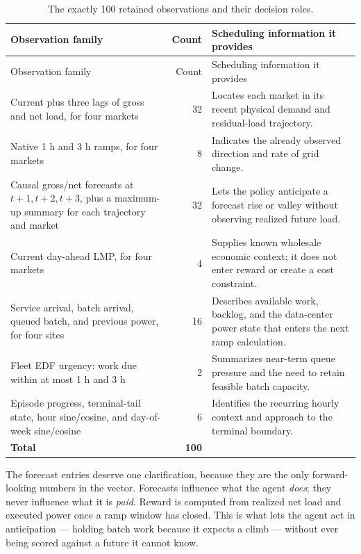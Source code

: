 ﻿\documentclass[12pt]{article}
\begin{document}
\begin{longtable}{@{}L{0.29\textwidth}rL{0.53\textwidth}@{}}
  \caption{The exactly 100 retained observations and their decision roles.}
  \label{tab:objective-observations}\\
  \toprule
  Observation family & Count & Scheduling information it provides \\
  \midrule
  \endfirsthead
  \toprule
  Observation family & Count & Scheduling information it provides \\
  \midrule
  \endhead
  Current plus three lags of gross and net load, for four markets
    & 32 & Locates each market in its recent physical demand and residual-load
      trajectory. \\
  Native 1 h and 3 h ramps, for four markets
    & 8 & Indicates the already observed direction and rate of grid change. \\
  Causal gross/net forecasts at \(t+1,t+2,t+3\), plus a maximum-up summary
  for each trajectory and market
    & 32 & Lets the policy anticipate a forecast rise or valley without observing
      realized future load. \\
  Current day-ahead LMP, for four markets
    & 4 & Supplies known wholesale economic context; it does not enter reward or
      create a cost constraint. \\
  Service arrival, batch arrival, queued batch, and previous power, for four
  sites
    & 16 & Describes available work, backlog, and the data-center power state that
      enters the next ramp calculation. \\
  Fleet EDF urgency: work due within at most 1 h and 3 h
    & 2 & Summarizes near-term queue pressure and the need to retain feasible
      batch capacity. \\
  Episode progress, terminal-tail state, hour sine/cosine, and day-of-week
  sine/cosine
    & 6 & Identifies the recurring hourly context and approach to the terminal
      boundary. \\
  \midrule
  \textbf{Total} & \textbf{100} & \\
  \bottomrule
\end{longtable}

The forecast entries deserve one clarification, because they are the only
forward-looking numbers in the vector. Forecasts influence what the agent
\emph{does}; they never influence what it is \emph{paid}. Reward is computed
from realized net load and executed power once a ramp window has closed. This is
what lets the agent act in anticipation --- holding batch work because it
expects a climb --- without ever being scored against a future it cannot know.
\end{document}
